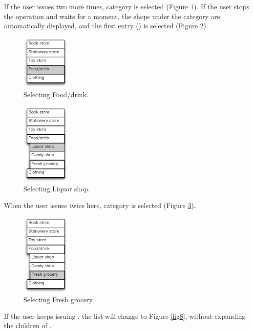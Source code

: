 \documentclass{article}
\begin{document}
If the user issues {\D} two more times, 
 category is selected (Figure \ref{fig4}).
If the user stops the operation and waits for a moment, the shops under the 
category are automatically displayed,
and the first entry () is selected (Figure \ref{fig5}).

\begin{figure}[H]
\centerline{\includegraphics[width=24mm,bb=0 0 139 157]{figures/fig4.pdf}}
\caption{Selecting Food/drink.}
\label{fig4}
\end{figure}

\begin{figure}[H]
\centerline{\includegraphics[width=24mm,bb=0 0 139 238]{figures/fig5.pdf}}
\caption{Selecting Liquor shop.}
\label{fig5}
\end{figure}

When the user issues {\D} twice here,
 category is selected (Figure \ref{fig6}).

\begin{figure}[H]
\centerline{\includegraphics[width=24mm,bb=0 0 139 238]{figures/fig6.pdf}}
\caption{Selecting Fresh grocery.}
\label{fig6}
\end{figure}

If the user keeps issuing {\D}, 
the list will change to Figure \ref{fig8},
without expanding the children of .
\end{document}
